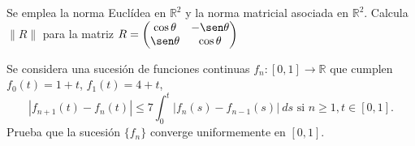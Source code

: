 \documentclass[12pt]{article}
\begin{document}
    \begin{ejercicio}
        Se emplea la norma Euclídea en $\mathbb{R}^2$ y la norma matricial asociada en $\mathbb{R}^2$. Calcula $\|R\|$ para la matriz $R=\displaystyle
        \begin{pmatrix}
            \cos\theta & -\sen\theta \\
            \sen\theta & \cos\theta
        \end{pmatrix}$
    \end{ejercicio}

    \begin{ejercicio}
        Se considera una sucesión de funciones continuas $f_n:[0,1]\rightarrow\mathbb{R}$ que cumplen $f_0(t)=1+t$, $f_1(t)=4+t$,
        \begin{equation*}
            |f_{n+1}(t) - f_n(t)| \leq 7 \int_{0}^{t} |f_n(s)-f_{n-1}(s)|~ds \text{\ si\ } n\geq 1, t\in [0,1].
        \end{equation*}
        Prueba que la sucesión $\{f_n\}$ converge uniformemente en $[0,1]$.
    \end{ejercicio}
\end{document}
